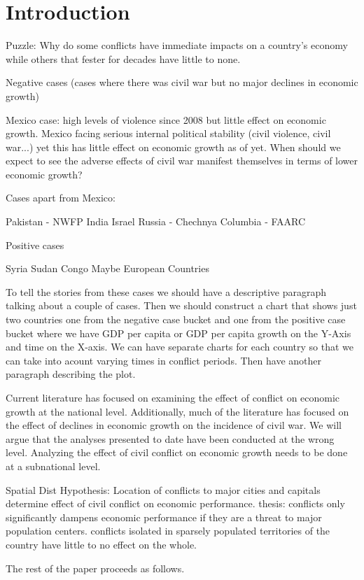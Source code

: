 \section{Introduction}
\label{intro}

Puzzle: Why do some conflicts have immediate impacts on a country's economy while others that fester for decades have little to none. 	

	Negative cases (cases where there was civil war but no major declines in economic growth)

		Mexico case: high levels of violence since 2008 but little effect on economic growth. Mexico facing serious internal political stability (civil violence, civil war...) yet this has little effect on economic growth as of yet. When should we expect to see the adverse effects of civil war manifest themselves in terms of lower economic growth?

	Cases apart from Mexico:

			Pakistan - NWFP
			India
			Israel
			Russia - Chechnya
			Columbia - FAARC

	Positive cases 

			Syria
			Sudan
			Congo
			Maybe European Countries

	To tell the stories from these cases we should have a descriptive paragraph talking about a couple of cases. Then we should construct a chart that shows just two countries one from the negative case bucket and one from the positive case bucket where we have GDP per capita or GDP per capita growth on the Y-Axis and time on the X-axis. We can have separate charts for each country so that we can take into acount varying times in conflict periods. Then have another paragraph describing the plot.

Current literature has focused on examining the effect of conflict on economic growth at the national level. Additionally, much of the literature has focused on the effect of declines in economic growth on the incidence of civil war. We will argue that the analyses presented to date have been conducted at the wrong level. Analyzing the effect of civil conflict on economic growth needs to be done at a subnational level. 

Spatial Dist Hypothesis: Location of conflicts to major cities and capitals determine effect of civil conflict on economic performance. thesis: conflicts only significantly dampens economic performance if they are a threat to major population centers. conflicts isolated in sparsely populated territories of the country have little to no effect on the whole. 

The rest of the paper proceeds as follows.